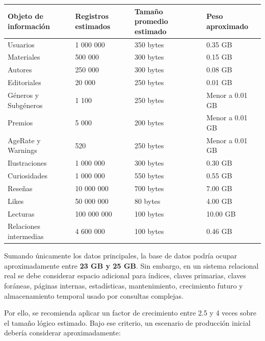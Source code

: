 \documentclass[12pt,a4paper]{article}
\begin{document}
\begin{longtable}{p{4cm} p{3cm} p{3cm} p{3.5cm}}
\toprule
\textbf{Objeto de información} & \textbf{Registros estimados} & \textbf{Tamaño promedio estimado} & \textbf{Peso aproximado} \\
\midrule
\endhead

Usuarios & 1 000 000 & 350 bytes & 0.35 GB \\

Materiales & 500 000 & 300 bytes & 0.15 GB \\

Autores & 250 000 & 300 bytes & 0.08 GB \\

Editoriales & 20 000 & 250 bytes & 0.01 GB \\

Géneros y Subgéneros & 1 100 & 250 bytes & Menor a 0.01 GB \\

Premios & 5 000 & 200 bytes & Menor a 0.01 GB \\

AgeRate y Warnings & 520 & 250 bytes & Menor a 0.01 GB \\

Ilustraciones & 1 000 000 & 300 bytes & 0.30 GB \\

Curiosidades & 1 000 000 & 550 bytes & 0.55 GB \\

Reseñas & 10 000 000 & 700 bytes & 7.00 GB \\

Likes & 50 000 000 & 80 bytes & 4.00 GB \\

Lecturas & 100 000 000 & 100 bytes & 10.00 GB \\

Relaciones intermedias & 4 600 000 & 100 bytes & 0.46 GB \\

\bottomrule
\end{longtable}

Sumando únicamente los datos principales, la base de datos podría ocupar aproximadamente entre \textbf{23 GB y 25 GB}. Sin embargo, en un sistema relacional real se debe considerar espacio adicional para índices, claves primarias, claves foráneas, páginas internas, estadísticas, mantenimiento, crecimiento futuro y almacenamiento temporal usado por consultas complejas.

Por ello, se recomienda aplicar un factor de crecimiento entre 2.5 y 4 veces sobre el tamaño lógico estimado. Bajo ese criterio, un escenario de producción inicial debería considerar aproximadamente:
\end{document}
